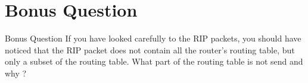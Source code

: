 \section{Bonus Question}

\begin{bonusQuestionBox}{Bonus Question}
    If you have looked carefully to the RIP packets, you should have noticed that the RIP packet does not contain all the router's routing table, but only a subset of the routing table. What part of the routing table is not send and why ?
\end{bonusQuestionBox}
